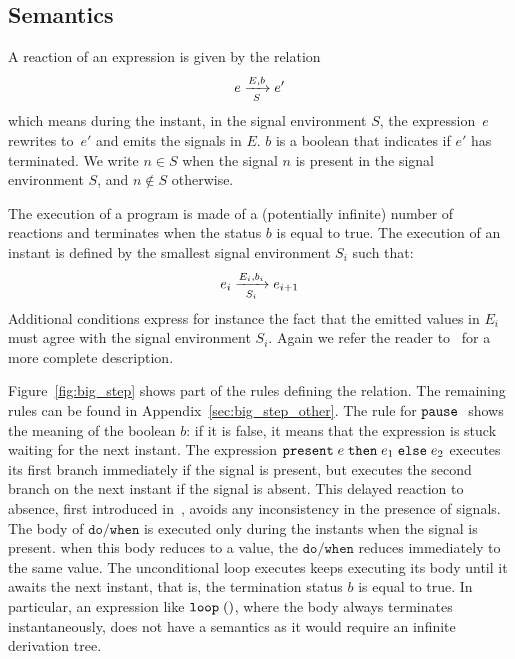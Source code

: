 \documentclass[9pt,preprint]{sigplanconf}
\begin{document}
\subsection{Semantics}

A reaction of an expression is given by the relation
\[  \bigstep{N}{e}{e'}{E}{b}{S} \]
which means during the instant, in the signal environment $S$, the expression~$e$ rewrites to~$e'$ and emits the signals in $E$. $b$ is a boolean that indicates if $e'$ has terminated. We write $n \in S$ when the signal $n$ is present in the signal environment $S$, and $n \not\in S$ otherwise.

The execution of a program is made of a (potentially infinite) number of reactions and terminates when the status $b$ is equal to true. The execution of an instant is defined by the smallest signal environment $S_i$ such that:
\[ \bigstep{N}{e_i}{e_{i+1}}{E_i}{b_i}{S_i} \]
Additional conditions express for instance the fact that the emitted values in $E_i$ must agree with the signal environment $S_i$. Again we refer the reader to~\cite{Mandel:2005} for a more complete description.



Figure~\ref{fig:big_step} shows part of the rules defining the relation. The remaining rules can be found in Appendix~\ref{sec:big_step_other}. The rule for $\epause{}$ shows the meaning of the boolean $b$: if it is false, it means that the expression is stuck waiting for the next instant. The expression $\epres{e}{e_1}{e_2}$ executes its first branch immediately if the signal is present, but executes the second branch on the next instant if the signal is absent. This delayed reaction to absence, first introduced in~\cite{Boussinot:1991}, avoids any inconsistency in the presence of signals. The body of $\mathtt{do/when}$ is executed only during the instants when the signal is present. when this body reduces to a value, the $\mathtt{do/when}$ reduces immediately to the same value. The unconditional loop executes keeps executing its body until it awaits the next instant, that is, the termination status $b$ is equal to true. In particular, an expression like $\eloop{\evoid{}}$, where the body always terminates instantaneously, does not have a semantics as it would require an infinite derivation tree.

\begin{figure*}
\begin{small}

\end{small}


\caption{Big-step semantics}
\label{fig:big_step}
\end{figure*}
\end{document}
